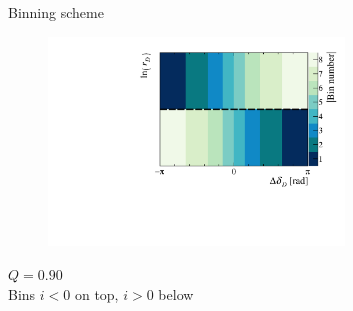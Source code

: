 \documentclass[dvipsnames]{beamer}
\begin{document}
\begin{frame}{Binning scheme}
  \begin{figure}
    \centering
    \includegraphics[width = 0.7\textwidth]{Plots/BinningSchemePlot_8Bins.pdf}
  \end{figure}
  \vspace{-1.0cm}
  \begin{center}
    $Q = 0.90$ \\
    Bins $i < 0$ on top, $i > 0$ below
  \end{center}
\end{frame}
\end{document}
